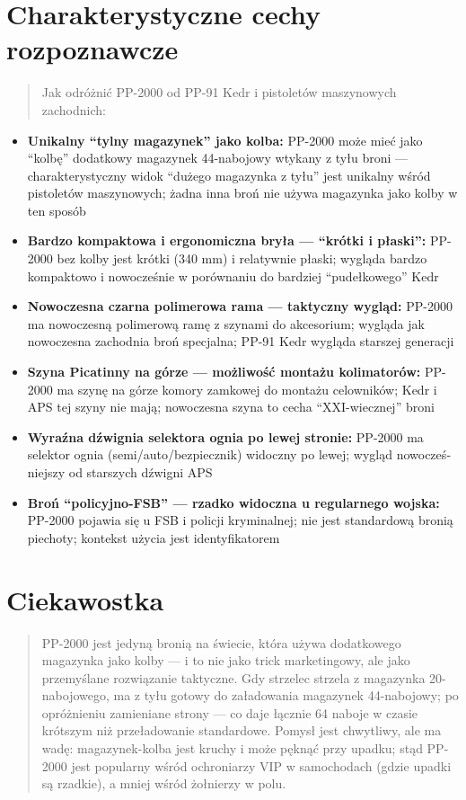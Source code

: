 \documentclass[12pt,openany,oneside]{book}
\providecommand{\tightlist}{%
  \setlength{\itemsep}{0pt}\setlength{\parskip}{0pt}}
\begin{document}
\section{Charakterystyczne cechy
rozpoznawcze}\label{charakterystyczne-cechy-rozpoznawcze-97}

\begin{quote}
Jak odróżnić PP-2000 od PP-91 Kedr i pistoletów maszynowych zachodnich:
\end{quote}

\begin{itemize}
\tightlist
\item
  \textbf{Unikalny ``tylny magazynek'' jako kolba:} PP-2000 może mieć
  jako ``kolbę'' dodatkowy magazynek 44-nabojowy wtykany z tyłu broni
  --- charakterystyczny widok ``dużego magazynka z tyłu'' jest unikalny
  wśród pistoletów maszynowych; żadna inna broń nie używa magazynka jako
  kolby w ten sposób
\item
  \textbf{Bardzo kompaktowa i ergonomiczna bryła --- ``krótki i
  płaski'':} PP-2000 bez kolby jest krótki (340 mm) i relatywnie płaski;
  wygląda bardzo kompaktowo i nowocześnie w porównaniu do bardziej
  ``pudełkowego'' Kedr
\item
  \textbf{Nowoczesna czarna polimerowa rama --- taktyczny wygląd:}
  PP-2000 ma nowoczesną polimerową ramę z szynami do akcesorium; wygląda
  jak nowoczesna zachodnia broń specjalna; PP-91 Kedr wygląda starszej
  generacji
\item
  \textbf{Szyna Picatinny na górze --- możliwość montażu kolimatorów:}
  PP-2000 ma szynę na górze komory zamkowej do montażu celowników; Kedr
  i APS tej szyny nie mają; nowoczesna szyna to cecha ``XXI-wiecznej''
  broni
\item
  \textbf{Wyraźna dźwignia selektora ognia po lewej stronie:} PP-2000 ma
  selektor ognia (semi/auto/bezpiecznik) widoczny po lewej; wygląd
  nowocześ­niejszy od starszych dźwigni APS
\item
  \textbf{Broń ``policyjno-FSB'' --- rzadko widoczna u regularnego
  wojska:} PP-2000 pojawia się u FSB i policji kryminalnej; nie jest
  standardową bronią piechoty; kontekst użycia jest identyfikatorem
\end{itemize}

\section{Ciekawostka}\label{ciekawostka-97}

\begin{quote}
PP-2000 jest jedyną bronią na świecie, która używa dodatkowego magazynka
jako kolby --- i to nie jako trick marketingowy, ale jako przemyślane
rozwiązanie taktyczne. Gdy strzelec strzela z magazynka 20-nabojowego,
ma z tyłu gotowy do załadowania magazynek 44-nabojowy; po opróżnieniu
zamieniane strony --- co daje łącznie 64 naboje w czasie krótszym niż
przeładowanie standardowe. Pomysł jest chwytliwy, ale ma wadę:
magazynek-kolba jest kruchy i może pęknąć przy upadku; stąd PP-2000 jest
popularny wśród ochroniarzy VIP w samochodach (gdzie upadki są rzadkie),
a mniej wśród żołnierzy w polu.
\end{quote}
\end{document}
